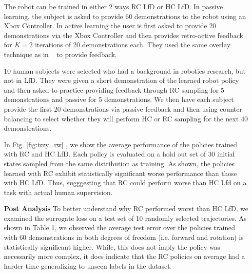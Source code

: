 \documentclass[10pt, conference]{ieeeconf}      %
\begin{document}
The robot can be trained in either 2 ways RC LfD or HC LfD. In passive learning, the subject is asked to provide 60 demonstrations to the robot using an Xbox Controller. In active learning the user is first asked to provide 20 demonstrations via the Xbox Controller and then provides retro-active feedback for $K=2$ iterations of 20 demonstrations each. They used the same overlay technique as in ~\cite{laskeyrobot} to provide feedback. 

10 human subjects were selected who had a background in robotics research, but not in LfD. They were given a short demonstration of the learned robot policy and then asked to practice providing feedback through RC sampling for 5 demonstrations and passive for 5 demonstrations. We then have each subject provide the first 20 demonstrations via passive feedback and then using counter-balancing to select whether they will perform HC or RC sampling for the next 40 demonstrations.  

In Fig. \ref{fig:izzy_rw} , we show the average performance of the policies trained with RC and HC LfD. Each policy is evaluated on a hold out set of 30 initial states sampled from the same distribution as training. As shown, the policies learned with RC exhibit statistically significant worse performance than those with HC LfD. Thus, sugggesting that RC could perform worse than HC Lfd on a task with actual human supervision. 

\noindent \textbf{Post Analysis}
To better understand why RC performed worst than HC LfD, we examined the surrogate loss on a test set of 10 randomly selected trajectories.  As shown in Table 1, we observed the average test error over the policies trained with 60 demonstrations in both degrees of freedom (i.e. forward and rotation) is statistically significant higher. While, this does not imply the policy was necessarily more complex, it does indicate that the RC policies on average had a harder time generalizing to unseen labels in the dataset. 
\end{document}

